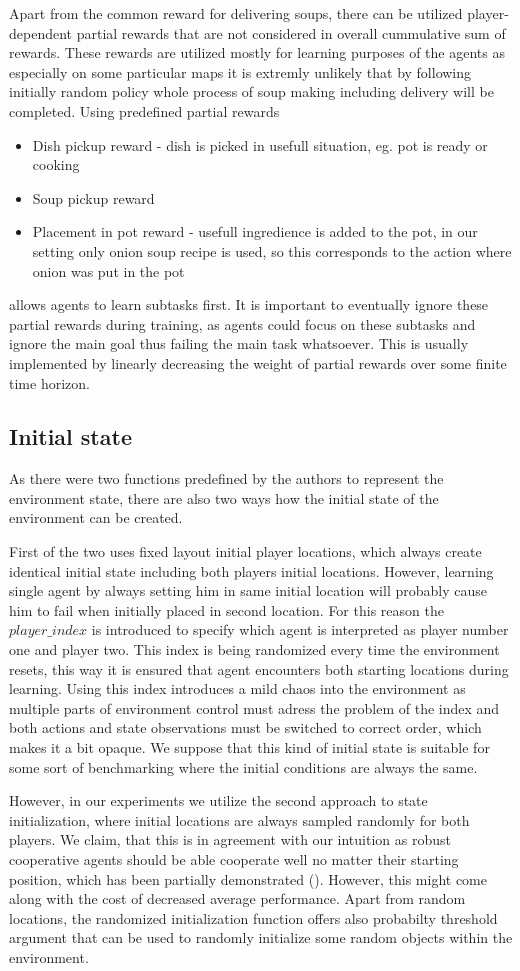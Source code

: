 Apart from the common reward for delivering soups, there can be utilized player-dependent partial rewards that are not considered in overall cummulative sum of rewards.
These rewards are utilized mostly for learning purposes of the agents as especially on some particular maps it is extremly unlikely that by following initially random policy whole process of soup making including delivery will be completed.
Using predefined partial rewards
\begin{itemize}
    \item Dish pickup reward - dish is picked in usefull situation, eg. pot is ready or cooking
    \item Soup pickup reward 
    \item Placement in pot reward - usefull ingredience is added to the pot, in our setting only onion soup recipe is used, so this corresponds to the action where onion was put in the pot
\end{itemize}
allows agents to learn subtasks first.
It is important to eventually ignore these partial rewards during training, as agents could focus on these subtasks and ignore the main goal thus failing the main task whatsoever.
This is usually implemented by linearly decreasing the weight of partial rewards over some finite time horizon.


\subsection{Initial state}
As there were two functions predefined by the authors to represent the environment state, there are also two ways how the initial state of the environment can be created.

First of the two uses fixed layout initial player locations, which always create identical initial state including both players initial locations.
However, learning single agent by always setting him in same initial location will probably cause him to fail when initially placed in second location.
For this reason the $player\_index$ is introduced to specify which agent is interpreted as player number one and player two.
This index is being randomized every time the environment resets, this way it is ensured that agent encounters both starting locations during learning.
Using this index introduces a mild chaos into the environment as multiple parts of environment control must adress the problem of the index and both actions and state observations must be switched to correct order, which makes it a bit opaque.
We suppose that this kind of initial state is suitable for some sort of benchmarking where the initial conditions are always the same.

However, in our experiments we utilize the second approach to state initialization, where initial locations are always sampled randomly for both players.
We claim, that this is in agreement with our intuition as robust cooperative agents should be able cooperate well no matter their starting position, which has been partially demonstrated (\cite{knott2021evaluating}).
However, this might come along with the cost of decreased average performance.
Apart from random locations, the randomized initialization function offers also probabilty threshold argument that can be used to randomly initialize some random objects within the environment.
